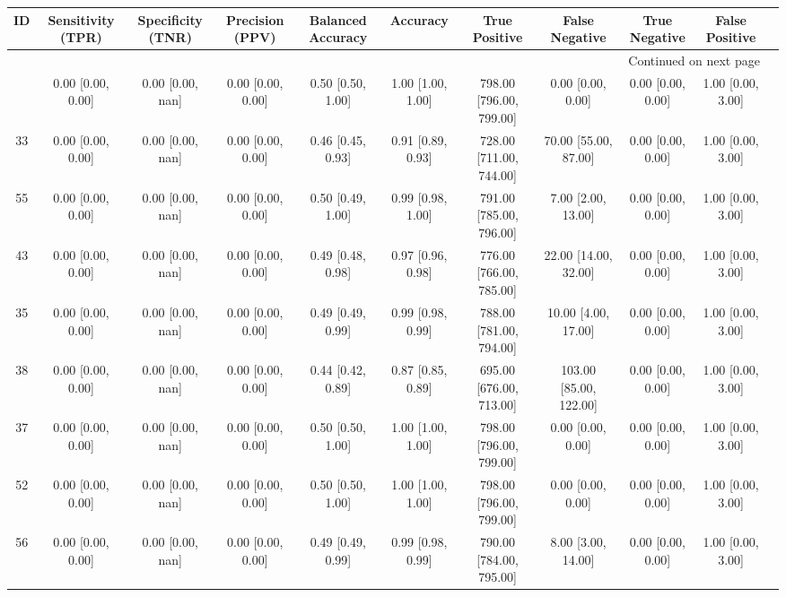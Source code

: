 \documentclass[8pt]{article}
\begin{document}
\begin{center}
\begin{footnotesize}
\begin{longtable}{|ccccccccccc|}
\toprule
 ID &  Sensitivity (TPR) & Specificity (TNR) &    Precision (PPV) &  Balanced Accuracy &           Accuracy &            True Positive &          False Negative &      True Negative &     False Positive \\
\midrule
\endhead
\midrule
\multicolumn{10}{r}{{Continued on next page}} \\
\midrule
\endfoot

\bottomrule
\endlastfoot
 44 &  0.00 [0.00, 0.00] &  0.00 [0.00, nan] &  0.00 [0.00, 0.00] &  0.50 [0.50, 1.00] &  1.00 [1.00, 1.00] &  798.00 [796.00, 799.00] &       0.00 [0.00, 0.00] &  0.00 [0.00, 0.00] &  1.00 [0.00, 3.00] \\
 33 &  0.00 [0.00, 0.00] &  0.00 [0.00, nan] &  0.00 [0.00, 0.00] &  0.46 [0.45, 0.93] &  0.91 [0.89, 0.93] &  728.00 [711.00, 744.00] &    70.00 [55.00, 87.00] &  0.00 [0.00, 0.00] &  1.00 [0.00, 3.00] \\
 55 &  0.00 [0.00, 0.00] &  0.00 [0.00, nan] &  0.00 [0.00, 0.00] &  0.50 [0.49, 1.00] &  0.99 [0.98, 1.00] &  791.00 [785.00, 796.00] &      7.00 [2.00, 13.00] &  0.00 [0.00, 0.00] &  1.00 [0.00, 3.00] \\
 43 &  0.00 [0.00, 0.00] &  0.00 [0.00, nan] &  0.00 [0.00, 0.00] &  0.49 [0.48, 0.98] &  0.97 [0.96, 0.98] &  776.00 [766.00, 785.00] &    22.00 [14.00, 32.00] &  0.00 [0.00, 0.00] &  1.00 [0.00, 3.00] \\
 35 &  0.00 [0.00, 0.00] &  0.00 [0.00, nan] &  0.00 [0.00, 0.00] &  0.49 [0.49, 0.99] &  0.99 [0.98, 0.99] &  788.00 [781.00, 794.00] &     10.00 [4.00, 17.00] &  0.00 [0.00, 0.00] &  1.00 [0.00, 3.00] \\
 38 &  0.00 [0.00, 0.00] &  0.00 [0.00, nan] &  0.00 [0.00, 0.00] &  0.44 [0.42, 0.89] &  0.87 [0.85, 0.89] &  695.00 [676.00, 713.00] &  103.00 [85.00, 122.00] &  0.00 [0.00, 0.00] &  1.00 [0.00, 3.00] \\
 37 &  0.00 [0.00, 0.00] &  0.00 [0.00, nan] &  0.00 [0.00, 0.00] &  0.50 [0.50, 1.00] &  1.00 [1.00, 1.00] &  798.00 [796.00, 799.00] &       0.00 [0.00, 0.00] &  0.00 [0.00, 0.00] &  1.00 [0.00, 3.00] \\
 52 &  0.00 [0.00, 0.00] &  0.00 [0.00, nan] &  0.00 [0.00, 0.00] &  0.50 [0.50, 1.00] &  1.00 [1.00, 1.00] &  798.00 [796.00, 799.00] &       0.00 [0.00, 0.00] &  0.00 [0.00, 0.00] &  1.00 [0.00, 3.00] \\
 56 &  0.00 [0.00, 0.00] &  0.00 [0.00, nan] &  0.00 [0.00, 0.00] &  0.49 [0.49, 0.99] &  0.99 [0.98, 0.99] &  790.00 [784.00, 795.00] &      8.00 [3.00, 14.00] &  0.00 [0.00, 0.00] &  1.00 [0.00, 3.00] \\
\end{longtable}
\end{footnotesize}
\end{center}
\end{document}
